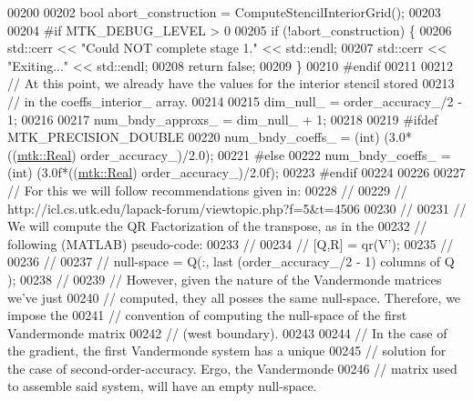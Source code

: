 \begin{DoxyCode}
00200 
00202   \textcolor{keywordtype}{bool} abort\_construction = ComputeStencilInteriorGrid();
00203 
00204 \textcolor{preprocessor}{  #if MTK\_DEBUG\_LEVEL > 0}
00205   \textcolor{keywordflow}{if} (!abort\_construction) \{
00206     std::cerr << \textcolor{stringliteral}{"Could NOT complete stage 1."} << std::endl;
00207     std::cerr << \textcolor{stringliteral}{"Exiting..."} << std::endl;
00208     \textcolor{keywordflow}{return} \textcolor{keyword}{false};
00209   \}
00210 \textcolor{preprocessor}{  #endif}
00211 
00212   \textcolor{comment}{// At this point, we already have the values for the interior stencil stored}
00213   \textcolor{comment}{// in the coeffs\_interior\_ array.}
00214 
00215   dim\_null\_ = order\_accuracy\_/2 - 1;
00216 
00217   num\_bndy\_approxs\_ = dim\_null\_ + 1;
00218 
00219 \textcolor{preprocessor}{  #ifdef MTK\_PRECISION\_DOUBLE}
00220   num\_bndy\_coeffs\_ = (int) (3.0*((\hyperlink{group__c01-roots_gac080bbbf5cbb5502c9f00405f894857d}{mtk::Real}) order\_accuracy\_)/2.0);
00221 \textcolor{preprocessor}{  #else}
00222   num\_bndy\_coeffs\_ = (int) (3.0f*((\hyperlink{group__c01-roots_gac080bbbf5cbb5502c9f00405f894857d}{mtk::Real}) order\_accuracy\_)/2.0f);
00223 \textcolor{preprocessor}{  #endif}
00224 
00226 
00227   \textcolor{comment}{// For this we will follow recommendations given in:}
00228   \textcolor{comment}{//}
00229   \textcolor{comment}{// http://icl.cs.utk.edu/lapack-forum/viewtopic.php?f=5&t=4506}
00230   \textcolor{comment}{//}
00231   \textcolor{comment}{// We will compute the QR Factorization of the transpose, as in the}
00232   \textcolor{comment}{// following (MATLAB) pseudo-code:}
00233   \textcolor{comment}{//}
00234   \textcolor{comment}{// [Q,R] = qr(V'); %
00235   \textcolor{comment}{// %
00236   \textcolor{comment}{//}
00237   \textcolor{comment}{// null-space = Q(:, last (order\_accuracy\_/2 - 1) columns of Q );}
00238   \textcolor{comment}{//}
00239   \textcolor{comment}{// However, given the nature of the Vandermonde matrices we've just}
00240   \textcolor{comment}{// computed, they all posses the same null-space. Therefore, we impose the}
00241   \textcolor{comment}{// convention of computing the null-space of the first Vandermonde matrix}
00242   \textcolor{comment}{// (west boundary).}
00243 
00244   \textcolor{comment}{// In the case of the gradient, the first Vandermonde system has a unique}
00245   \textcolor{comment}{// solution for the case of second-order-accuracy. Ergo, the Vandermonde}
00246   \textcolor{comment}{// matrix used to assemble said system, will have an empty null-space.}
}}
\end{DoxyCode}

